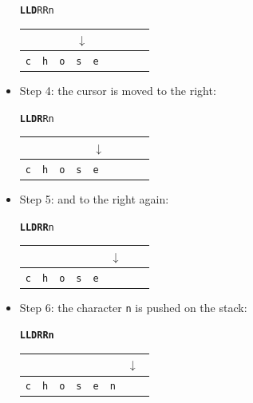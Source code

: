 \begin{itemize}
\begin{center}
\texttt{\textbf{LLD}RRn}

\begin{tabular}{|l|l|l|l|l|l|l|l}
\multicolumn{3}{l}{} & \multicolumn{5}{l}{$\downarrow$} \\
\hline
\verb+c+ & \verb+h+ & \verb+o+ & \verb+s+ & \verb+e+ & \verb+ + & \verb+ + & \\
\hline
\end{tabular}
\end{center}

\bigskip
\item Step 4: the cursor is moved to the right:

\begin{center}
\texttt{\textbf{LLDR}Rn}

\begin{tabular}{|l|l|l|l|l|l|l|l}
\multicolumn{4}{l}{} & \multicolumn{4}{l}{$\downarrow$} \\
\hline
\verb+c+ & \verb+h+ & \verb+o+ & \verb+s+ & \verb+e+ & \verb+ + & \verb+ + & \\
\hline
\end{tabular}
\end{center}

\bigskip
\item Step 5: and to the right again:

\begin{center}
\texttt{\textbf{LLDRR}n}

\begin{tabular}{|l|l|l|l|l|l|l|l}
\multicolumn{5}{l}{} & \multicolumn{3}{l}{$\downarrow$} \\
\hline
\verb+c+ & \verb+h+ & \verb+o+ & \verb+s+ & \verb+e+ & \verb+ + & \verb+ + & \\
\hline
\end{tabular}
\end{center}

\bigskip
\item Step 6: the character \verb+n+ is pushed on the stack:

\begin{center}
\texttt{\textbf{LLDRRn}}

\begin{tabular}{|l|l|l|l|l|l|l|l}
\multicolumn{6}{l}{} & \multicolumn{2}{l}{$\downarrow$} \\
\hline
\verb+c+ & \verb+h+ & \verb+o+ & \verb+s+ & \verb+e+ & \verb+n+ & \verb+ + & \\
\hline
\end{tabular}
\end{center}
\end{itemize}


